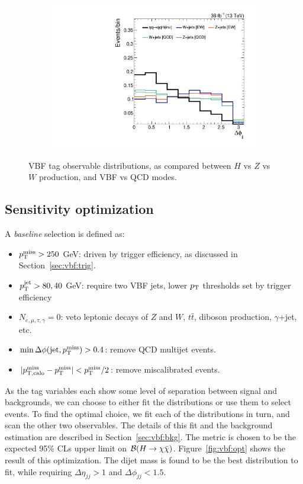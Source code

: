\begin{figure}[]
\begin{center}
\begin{subfigure}[t]{0.32\textwidth}
            \includegraphics[width=\textwidth]{figures/vbf/shapes/loosesignal_jot12DPhi.pdf}
            \caption{\dphi}
        \end{subfigure}
        \caption{VBF tag observable distributions, as compared between $H$ vs $Z$ vs $W$ production, and VBF vs QCD modes.}
        \label{fig:vbf:dijetkins}
    \end{center}
\end{figure}

\subsection{Sensitivity optimization}

A \emph{baseline} selection is defined as:
\begin{itemize}
    \item $p_\mathrm{T}^\mathrm{miss}>250$ GeV: driven by trigger efficiency, as discussed in Section~\ref{sec:vbf:trig}.
    \item $p_\mathrm{T}^\mathrm{jet}>80,40$ GeV: require two VBF jets, lower $p_\mathrm{T}$ thresholds set by trigger efficiency
    \item $N_{e,\mu,\tau,\gamma}=0$: veto leptonic decays of $Z$ and $W$, $t\bar{t}$, diboson production, $\gamma$+jet, etc.
    \item $\min\Delta\phi(\mathrm{jet},p_\mathrm{T}^\mathrm{miss})>0.4$: remove QCD multijet events.
    \item $|p^\mathrm{miss}_\mathrm{T,calo}-p_\mathrm{T}^\mathrm{miss}|<p_\mathrm{T}^\mathrm{miss}/2$: remove miscalibrated events.
\end{itemize}

As the tag variables each show some level of separation between signal and backgrounds, we can choose to either fit the distributions or use them to select events. 
To find the optimal choice, we fit each of the distributions in turn, and scan the other two observables.
The details of this fit and the background estimation are described in Section~\ref{sec:vbf:bkg}.
The metric is chosen to be the expected 95\% CLs upper limit on $\mathcal{B}(H\rightarrow\chi\bar\chi)$.
Figure~\ref{fig:vbf:opt} shows the result of this optimization.
The dijet mass is found to be the best distribution to fit, while requiring $\Delta\eta_{jj}>1$ and $\Delta\phi_{jj}<1.5$.

